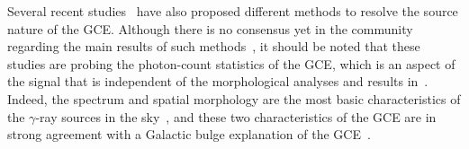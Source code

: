 \documentclass[doublespace,draft,nopageskip]{VTthesis} %
\begin{document}
Several recent studies~\cite[e.g.,][]{Lee:2015fea,Bartels:2015aea, Leane:2019xiy,Balaji:2018rwz,Chang:2019ars,Leane:2020pfc,Leane:2020nmi,Buschmann:2020adf,Calore:2021bty} have also proposed different methods to resolve the source nature of the GCE. Although there is no consensus yet in the community regarding the main results of such methods~\cite[e.g.,][]{Leane:2020pfc,Leane:2020nmi,Buschmann:2020adf,Bartels:2015aea,Balaji:2018rwz}, it should be noted that these studies are probing the photon-count statistics of the GCE, which is an aspect of the signal that is independent of the morphological analyses and results in~\citep{Macias:2016nev,Bartels:2017vsx, Macias:2019omb}. Indeed, the spectrum and spatial morphology are the most basic characteristics of the $\gamma$-ray sources in the sky~\citep{Fermi-LAT:4FGL}, and these two characteristics of the GCE are in strong agreement with a Galactic bulge explanation of the GCE~\cite[e.g.,][]{Abazajian:2020tww}. 
\end{document}
